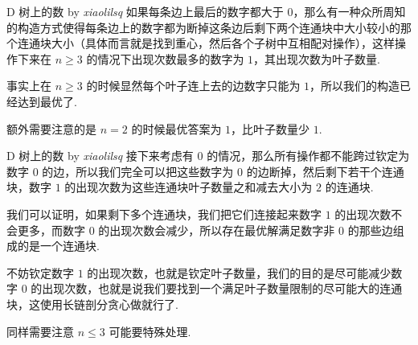\begin{frame}{D 树上的数 by \itshape xiaolilsq}
		如果每条边上最后的数字都大于 $0$，那么有一种众所周知的构造方式使得每条边上的数字都为断掉这条边后剩下两个连通块中大小较小的那个连通块大小（具体而言就是找到重心，然后各个子树中互相配对操作），这样操作下来在 $n\ge 3$ 的情况下出现次数最多的数字为 $1$，其出现次数为叶子数量. \pause
		
		事实上在 $n\ge 3$ 的时候显然每个叶子连上去的边数字只能为 $1$，所以我们的构造已经达到最优了. \pause
		
		额外需要注意的是 $n=2$ 的时候最优答案为 $1$，比叶子数量少 $1$.
		
	\end{frame}

\begin{frame}{D 树上的数 by \itshape xiaolilsq}
	接下来考虑有 $0$ 的情况，那么所有操作都不能跨过钦定为数字 $0$ 的边，所以我们完全可以把这些数字为 $0$ 的边断掉，然后剩下若干个连通块，数字 $1$ 的出现次数为这些连通块叶子数量之和减去大小为 $2$ 的连通块. \pause
	
	我们可以证明，如果剩下多个连通块，我们把它们连接起来数字 $1$ 的出现次数不会更多，而数字 $0$ 的出现次数会减少，所以存在最优解满足数字非 $0$ 的那些边组成的是一个连通块. \pause
	
	不妨钦定数字 $1$ 的出现次数，也就是钦定叶子数量，我们的目的是尽可能减少数字 $0$ 的出现次数，也就是说我们要找到一个满足叶子数量限制的尽可能大的连通块，这使用长链剖分贪心做就行了. \pause
	
	同样需要注意 $n\le 3$ 可能要特殊处理.
\end{frame}